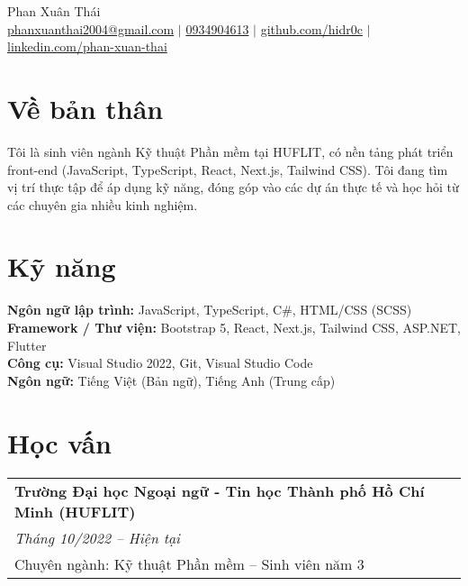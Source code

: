 \documentclass[a4paper,11pt]{article}
\begin{document}
\pagestyle{empty}

\begin{center}
\LARGE{Phan Xuân Thái} \\[5pt]
\small{\href{mailto:phanxuanthai2004@gmail.com}{phanxuanthai2004@gmail.com} $|$ 
\href{tel:0934904613}{0934904613} $|$ 
\href{https://github.com/hidr0c}{github.com/hidr0c} $|$ 
\href{https://www.linkedin.com/in/xuân-thái-phan-bab693352/}{linkedin.com/phan-xuan-thai} 
} \\[2pt]
\end{center}
\vspace{1.5em}

\section{Về bản thân}
\begin{spacing}{1.05}
Tôi là sinh viên ngành Kỹ thuật Phần mềm tại HUFLIT, có nền tảng phát triển front-end (JavaScript, TypeScript, React, Next.js, Tailwind CSS). Tôi đang tìm vị trí thực tập để áp dụng kỹ năng, đóng góp vào các dự án thực tế và học hỏi từ các chuyên gia nhiều kinh nghiệm.
\end{spacing}

\section{Kỹ năng}
\begin{spacing}{1.05}
\textbf{Ngôn ngữ lập trình:} JavaScript, TypeScript, C\#, HTML/CSS (SCSS) \\
\textbf{Framework / Thư viện:} Bootstrap 5, React, Next.js, Tailwind CSS, ASP.NET, Flutter \\
\textbf{Công cụ:} Visual Studio 2022, Git, Visual Studio Code \\
\textbf{Ngôn ngữ:} Tiếng Việt (Bản ngữ), Tiếng Anh (Trung cấp)
\end{spacing}

\section{Học vấn}
\begin{spacing}{1.05}
\begin{tabularx}{\linewidth}{@{}l@{}}
\textbf{Trường Đại học Ngoại ngữ - Tin học Thành phố Hồ Chí Minh (HUFLIT)} \\
\normalsize\textit{Tháng 10/2022 -- Hiện tại} \\
Chuyên ngành: Kỹ thuật Phần mềm -- Sinh viên năm 3
\end{tabularx}
\end{spacing}
\end{document}
